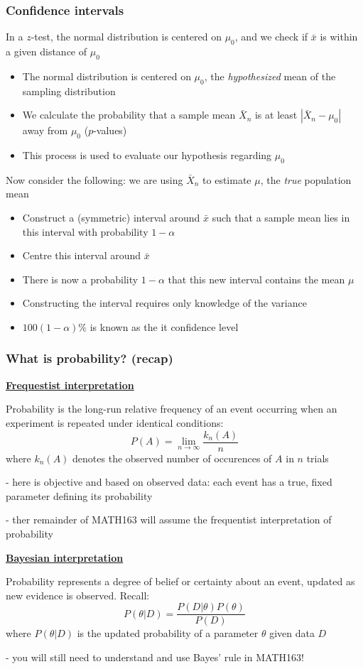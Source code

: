 \documentclass[t,8pt]{beamer}%
\begin{document}
\begin{frame}
	\frametitle{Confidence intervals}
	In a $z$-test, the normal distribution is centered on $\mu_0$, and we check if $\bar x$ is within a given distance of $\mu_0$
    \begin{itemize}
        \item The normal distribution is centered on $\mu_0$, the {\it hypothesized} mean of the sampling distribution
        \item We calculate the probability that a sample mean $\bar X_n$ is at least $|\bar X_n-\mu_0|$ away from $\mu_0$ ($p$-values)
        \item This process is used to evaluate our hypothesis regarding $\mu_0$
    \end{itemize}
    Now consider the following: we are using $\bar X_n$ to estimate $\mu$, the {\it true} population mean
    \begin{itemize}
        \item Construct a (symmetric) interval around $\bar x$ such that a sample mean lies in this interval with probability $1-\alpha$
        \item Centre this interval around $\bar x$
        \item There is now a probability $1-\alpha$ that this new interval contains the mean $\mu$
        \item Constructing the interval requires only knowledge of the variance
        \item $100(1-\alpha)\%$ is known as the {it confidence level}
    \end{itemize}
\end{frame}

\begin{frame}
		\frametitle{What is probability? (recap)}
		{\bf\underline{Frequestist interpretation}} \par
		Probability is the long-run relative frequency of an event occurring when an experiment is repeated under identical conditions:
		$$P(A)=\lim_{n\rightarrow\infty}\frac{k_n(A)}n$$
		where $k_n(A)$ denotes the observed number of occurences of $A$ in $n$ trials \par
		{\small\color{NavyBlue} - here is objective and based on observed data: each event has a true, fixed parameter defining its probability \par
			- ther remainder of MATH163 will assume the frequentist interpretation of probability} \par
		{\bf\underline{Bayesian interpretation}} \par
		Probability represents a degree of belief or certainty about an event, updated as new evidence is observed. Recall:
		$$P(\theta\vert D)=\frac{P(D\vert\theta)P(\theta)}{P(D)}$$
		where $P(\theta\vert D)$ is the updated probability of a parameter $\theta$ given data $D$ \par
		{\small\color{NavyBlue} - you will still need to understand and use Bayes' rule in MATH163!}
\end{frame}
\end{document}
